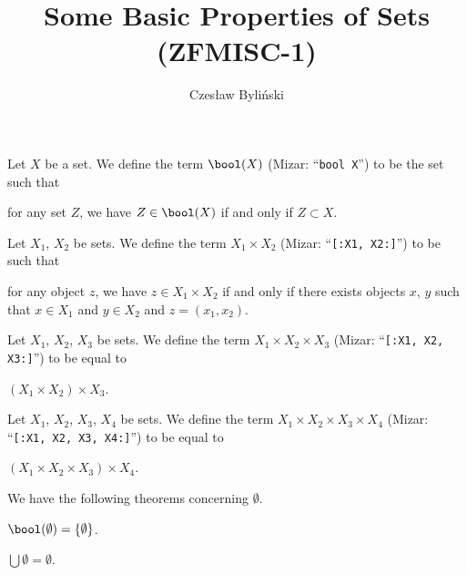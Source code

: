 \documentclass{article}
\title{Some Basic Properties of Sets (ZFMISC-1)}
\author{Czes{\l}aw Byli\'nski}
\begin{document}
\maketitle
\begin{definition}
Let $X$ be a set.
We define the term $\bool(X)$ (Mizar: ``\verb#bool X#'') to be the set such that
\begin{defn}
\item for any set $Z$, we have $Z\in\bool(X)$ if and only if $Z\subset X$.
\end{defn}
\end{definition}

\begin{definition}
Let $X_{1}$, $X_{2}$ be sets.
We define the term $X_{1}\times X_{2}$ (Mizar:
``\verb#[:X1, X2:]#'') to be such that
\begin{defn}
\item for any object $z$, we have $z\in X_{1}\times X_{2}$ if and only
  if there exists objects $x$, $y$ such that $x\in X_{1}$ and $y\in X_{2}$ and $z=(x_{1},x_{2})$.
\end{defn}
\end{definition}

\begin{definition}
Let $X_{1}$, $X_{2}$, $X_{3}$ be sets.
We define the term $X_{1}\times X_{2}\times X_{3}$ (Mizar:
``\verb#[:X1, X2, X3:]#'') to be equal to
\begin{defn}
\item $(X_{1}\times X_{2})\times X_{3}$.
\end{defn}
\end{definition}

\begin{definition}
Let $X_{1}$, $X_{2}$, $X_{3}$, $X_{4}$ be sets.
We define the term $X_{1}\times X_{2}\times X_{3}\times X_{4}$ (Mizar:
``\verb#[:X1, X2, X3, X4:]#'') to be equal to
\begin{defn}
\item $(X_{1}\times X_{2}\times X_{3})\times X_{4}$.
\end{defn}
\end{definition}

We have the following theorems concerning $\emptyset$.
\begin{thm}
\item\label{zfmisc1:1} $\bool(\emptyset)=\{\emptyset\}$.
\item\label{zfmisc1:2} $\bigcup\emptyset=\emptyset$.
\end{thm}
\end{document}
